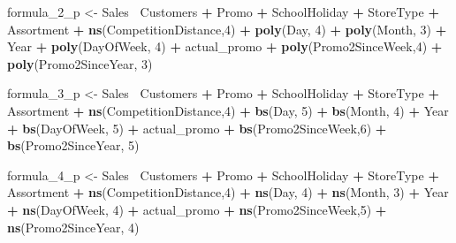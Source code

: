 \documentclass[]{article}
\newenvironment{Shaded}{\begin{snugshade}}{\end{snugshade}}
\newcommand{\DecValTok}[1]{\textcolor[rgb]{0.00,0.00,0.81}{#1}}
\newcommand{\KeywordTok}[1]{\textcolor[rgb]{0.13,0.29,0.53}{\textbf{#1}}}
\newcommand{\NormalTok}[1]{#1}
\newcommand{\OperatorTok}[1]{\textcolor[rgb]{0.81,0.36,0.00}{\textbf{#1}}}
\newcommand{\StringTok}[1]{\textcolor[rgb]{0.31,0.60,0.02}{#1}}
\begin{document}
\begin{Shaded}
\begin{Highlighting}[]
\NormalTok{formula_}\DecValTok{2}\NormalTok{_p <-}\StringTok{ }\NormalTok{Sales}\OperatorTok{~}\StringTok{ }\NormalTok{Customers }\OperatorTok{+}\StringTok{ }\NormalTok{Promo }\OperatorTok{+}\StringTok{ }\NormalTok{SchoolHoliday }\OperatorTok{+}\StringTok{ }\NormalTok{StoreType }\OperatorTok{+}\StringTok{ }\NormalTok{Assortment }\OperatorTok{+}\StringTok{ }\KeywordTok{ns}\NormalTok{(CompetitionDistance,}\DecValTok{4}\NormalTok{) }\OperatorTok{+}\StringTok{ }\KeywordTok{poly}\NormalTok{(Day, }\DecValTok{4}\NormalTok{) }\OperatorTok{+}\StringTok{ }\KeywordTok{poly}\NormalTok{(Month, }\DecValTok{3}\NormalTok{) }\OperatorTok{+}\StringTok{ }\NormalTok{Year }\OperatorTok{+}\StringTok{ }\KeywordTok{poly}\NormalTok{(DayOfWeek, }\DecValTok{4}\NormalTok{) }\OperatorTok{+}\StringTok{ }\NormalTok{actual_promo }\OperatorTok{+}\StringTok{ }\KeywordTok{poly}\NormalTok{(Promo2SinceWeek,}\DecValTok{4}\NormalTok{) }\OperatorTok{+}\StringTok{ }\KeywordTok{poly}\NormalTok{(Promo2SinceYear, }\DecValTok{3}\NormalTok{)}

\NormalTok{formula_}\DecValTok{3}\NormalTok{_p <-}\StringTok{ }\NormalTok{Sales}\OperatorTok{~}\StringTok{ }\NormalTok{Customers }\OperatorTok{+}\StringTok{ }\NormalTok{Promo }\OperatorTok{+}\StringTok{ }\NormalTok{SchoolHoliday }\OperatorTok{+}\StringTok{ }\NormalTok{StoreType }\OperatorTok{+}\StringTok{ }\NormalTok{Assortment }\OperatorTok{+}\StringTok{ }\KeywordTok{ns}\NormalTok{(CompetitionDistance,}\DecValTok{4}\NormalTok{) }\OperatorTok{+}\StringTok{ }\KeywordTok{bs}\NormalTok{(Day, }\DecValTok{5}\NormalTok{) }\OperatorTok{+}\StringTok{ }\KeywordTok{bs}\NormalTok{(Month, }\DecValTok{4}\NormalTok{) }\OperatorTok{+}\StringTok{ }\NormalTok{Year }\OperatorTok{+}\StringTok{ }\KeywordTok{bs}\NormalTok{(DayOfWeek, }\DecValTok{5}\NormalTok{) }\OperatorTok{+}\StringTok{ }\NormalTok{actual_promo }\OperatorTok{+}\StringTok{ }\KeywordTok{bs}\NormalTok{(Promo2SinceWeek,}\DecValTok{6}\NormalTok{) }\OperatorTok{+}\StringTok{ }\KeywordTok{bs}\NormalTok{(Promo2SinceYear, }\DecValTok{5}\NormalTok{)}

\NormalTok{formula_}\DecValTok{4}\NormalTok{_p <-}\StringTok{ }\NormalTok{Sales}\OperatorTok{~}\StringTok{ }\NormalTok{Customers }\OperatorTok{+}\StringTok{ }\NormalTok{Promo }\OperatorTok{+}\StringTok{ }\NormalTok{SchoolHoliday }\OperatorTok{+}\StringTok{ }\NormalTok{StoreType }\OperatorTok{+}\StringTok{ }\NormalTok{Assortment }\OperatorTok{+}\StringTok{ }\KeywordTok{ns}\NormalTok{(CompetitionDistance,}\DecValTok{4}\NormalTok{) }\OperatorTok{+}\StringTok{ }\KeywordTok{ns}\NormalTok{(Day, }\DecValTok{4}\NormalTok{) }\OperatorTok{+}\StringTok{ }\KeywordTok{ns}\NormalTok{(Month, }\DecValTok{3}\NormalTok{) }\OperatorTok{+}\StringTok{ }\NormalTok{Year }\OperatorTok{+}\StringTok{ }\KeywordTok{ns}\NormalTok{(DayOfWeek, }\DecValTok{4}\NormalTok{) }\OperatorTok{+}\StringTok{ }\NormalTok{actual_promo }\OperatorTok{+}\StringTok{ }\KeywordTok{ns}\NormalTok{(Promo2SinceWeek,}\DecValTok{5}\NormalTok{) }\OperatorTok{+}\StringTok{ }\KeywordTok{ns}\NormalTok{(Promo2SinceYear, }\DecValTok{4}\NormalTok{)}
\end{Highlighting}
\end{Shaded}
\end{document}

